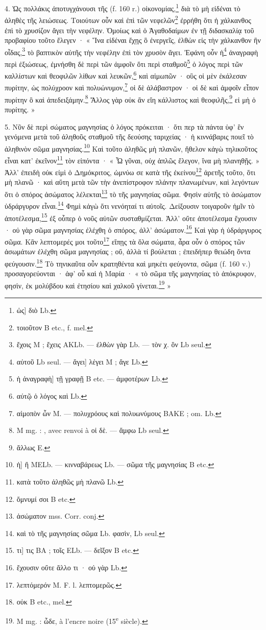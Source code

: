 \documentclass[landscape, a4paper, 11pt, oneside, polutonikogreek, french]{article}
\newcommand*\svgA{}
\begin{document}
4. Ὡς πολλάκις ἀποτυγχάνουσι τῆς (f. 160 r.) οἰκονομίας,\footnote{ὡς] διὸ Lb.} διὰ τὸ μὴ εἰδέναι τὸ ἀληθὲς τῆς λειώσεως. Τοιούτων οὖν καὶ ἐπὶ τῶν νεφελῶν\footnote{τοιοῦτον B etc., f. mel.} ἐρρήθη ὅτι ἡ χάλκανθος ἐπὶ τὸ χρυσίζον ἄγει τὴν νεφέλην. Ὁμοίως καὶ ὁ Ἀγαθοδαίμων ἐν τῇ διδασκαλίᾳ τοῦ προβαφίου τοῦτο ἔλεγεν · « Ἵνα εἰδέναι ἔχῃς ὃ ἐνεργεῖς, ἐλθὼν εἰς τὴν χάλκανθον ἣν οἶδας,\footnote{ἔχοις M ; ἔχεις AKLb. --- ἐλθὼν γὰρ Lb. --- τὸν χ. ὃν Lb seul.} τὸ βαπτικὸν αὐτῆς τὴν νεφέλην ἐπὶ τὸν χρυσὸν ἄγει. Ἐφάνη οὖν ἡ\footnote{αὐτοῦ Lb seul. --- ἄγει] λέγει M ; ἄγε Lb.} ἀναγραφὴ περὶ ἐξιώσεως, ἐμνήσθη δὲ περὶ τῶν ἀμφοῖν ὅτι περὶ σταθμοῦ\footnote{ἡ ἀναγραφὴ] τῇ γραφῇ B etc. --- ἀμφοτέρων Lb.} ὁ λόγος περὶ τῶν καλλίστων καὶ θεοφιλῶν λίθων καὶ λευκῶν,\footnote{αύτῷ ὁ λόγος καὶ Lb.} καὶ αἱμωπῶν · οὓς οἱ μὲν ἐκάλεσαν πυρίτην, ὡς πολύχροον καὶ πολυώνυμον,\footnote{αἱμοπὸν ὧν M. --- πολυχρόους καὶ πολυωνύμους BAKE ; om. Lb.} οἱ δὲ ἀλάβαστρον · οἱ δὲ καὶ ἀμφοῖν εἶπον πυρίτην ὃ καὶ ἀπεδειξάμην.\footnote{M mg. : $\svgA$, avec renvoi à οἱ δὲ. --- ἄμφω Lb seul.} Ἄλλος γὰρ οὐκ ἂν εἴη κάλλιστος καὶ θεοφιλῆς,\footnote{ἄλλως E.} εἰ μὴ ὁ πυρίτης. »

5. Νῦν δὲ περὶ σώματος μαγνησίας ὁ λόγος πρόκειται · ὅτι περ τὰ πάντα ὑφ' ἓν γενόμενα μετὰ τοῦ ἀληθοῦς σταθμοῦ τῆς δεούσης ταριχείας · ἡ κιννάβαρις ποιεῖ τὸ ἀληθινὸν σῶμα μαγνησίας.\footnote{ἡ] ἢ MELb. --- κινναβάρεως Lb. --- σῶμα τῆς μαγνησίας B etc.} Καὶ τοῦτο ἀληθῶς μὴ πλανῶν, ἤθελον κἀγὼ τηλικοῦτος εἶναι κατ' ἐκεῖνον\footnote{κατὰ τοῦτο ἀληθῶς μὴ πλανῶ Lb.} τὸν εἰπόντα · « Ὦ γῦναι, οὐχ ἁπλῶς ἔλεγον, ἵνα μὴ πλανηθῇς. » Ἀλλ' ἐπειδὴ οὐκ εἰμὶ ὁ Δημόκριτος, ὠμνύω σε κατὰ τῆς ἐκείνου\footnote{ὄμνυμί σοι B etc.} ἀρετῆς τοῦτο, ὅτι μὴ πλανῶ · καὶ αὕτη μετὰ τῶν τὴν ἀνεπίστροφον πλάνην πλανωμένων, καὶ λεγόντων ὅτι ὁ σπόρος ἀσώματος λέλεκται\footnote{ἀσώματον mss. Corr. conj.} τὸ τῆς μαγνησίας σῶμα. Φησὶν αὐτῆς τὸ ἀσώματον ὑδράργυρον εἶναι.\footnote{καὶ τὸ τῆς μαγνησίας σῶμα Lb. φασὶν, Lb seul.} Φημὶ κἀγὼ ὅτι νενόηταί τι αὐτοῖς. Δείξουσιν τοιγαροῦν ἡμῖν τὸ ἀποτέλεσμα,\footnote{τι] τις BA ; τοῖς ELb. --- δεῖξον B etc.} ἐξ οὗπερ ὁ νοῦς αὐτῶν συσταθμίζεται. Ἀλλ' οὔτε ἀποτέλεσμα ἔχουσιν · οὐ γὰρ σῶμα μαγνησίας ἐλέχθη ὁ σπόρος, ἀλλ' ἀσώματον.\footnote{ἔχουσιν οὔτε ἄλλο τι · οὐ γὰρ Lb.} Καὶ γὰρ ἡ ὑδράργυρος σῶμα. Κἂν λεπτομερές μοι τοῦτο\footnote{λεπτόμερόν M. F. l. λεπτομερῶς.} εἴπῃς τὰ ὅλα σώματα, ἆρα οὖν ὁ σπόρος τῶν ἀσωμάτων ἐλέχθη σῶμα μαγνησίας ; οὔ, ἀλλὰ τί βούλεται ; ἐπειδήπερ θειώδη ὄντα φεύγουσιν.\footnote{οὐκ B etc., mel.} Τὸ τηνικαῦτα οὖν κρατηθέντα καὶ μηκέτι φεύγοντα, σῶμα (f. 160 v.) προσαγορεύονται · ἀφ' οὗ καὶ ἡ Μαρία · « τὸ σῶμα τῆς μαγνησίας τὸ ἀπόκρυφον, φησὶν, ἐκ μολύβδου καὶ ἐτησίου καὶ χαλκοῦ γίνεται.\footnote{M mg. : ὧδε, à l'encre noire (15\textsuperscript{e} siècle).} »
\end{document}
